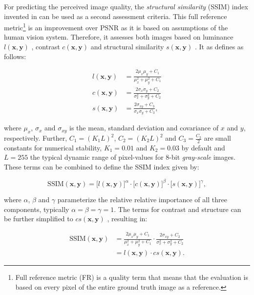 For predicting the perceived image quality, the \textit{structural similarity} (SSIM) index invented in \parencite{ssim} can be used as a second assessment criteria. This full reference metric\footnote{Full reference metric (FR) is a quality term that means that the evaluation is based on every pixel of the entire ground truth image as a reference.} is an improvement over PSNR as it is based on assumptions of the human vision system. Therefore, it assesses both images based on luminance $ l(\textbf{x}, \textbf{y}) $ , contrast $ c(\textbf{x}, \textbf{y}) $ and structural similarity $ s(\textbf{x}, \textbf{y}) $ \parencite{ms-ssim}. It as defines as follows:

\begin{equation} \label{eq:ssim-components}
\begin{aligned}
l(\textbf{x}, \textbf{y}) &= \frac{2 \mu_x \mu_y + C_1}{\mu_x^2 + \mu_y^2 + C_1} \\
c(\textbf{x}, \textbf{y}) &= \frac{2 \sigma_x \sigma_y + C_2}{\sigma_x^2 + \sigma_y^2 + C_2} \\
s(\textbf{x}, \textbf{y}) &= \frac{2 \sigma_{xy} + C_3}{\sigma_x \sigma_y + C_3} ,
\end{aligned}
\end{equation}

where $ \mu_x $, $ \sigma_x $ and $ \sigma_{xy} $ is the mean, standard deviation and covariance of $ x $ and $ y $, respectively. Further, $ C_1 = (K_1 L)^2 $, $ C_2 = (K_2 L)^2 $ and $ C_3 = \frac{C_2}{2} $ are small constants for numerical stability, $K_1 = 0.01$ and $ K_2 = 0.03 $ by default and $ L=255 $ the typical dynamic range of pixel-values for 8-bit \textit{gray-scale} images. These terms can be combined to define the SSIM index given by:

\begin{equation} \label{eq:ssim-combined}
\textrm{SSIM}(\textbf{x}, \textbf{y}) = \big[ l(\textbf{x}, \textbf{y})\big]^{\alpha} \cdot \big[c(\textbf{x}, \textbf{y}) \big]^{\beta} \cdot \big[ s(\textbf{x}, \textbf{y}) \big]^{\gamma} ,
\end{equation}

where $ \alpha $, $ \beta $ and $ \gamma $ parameterize the relative relative importance of all three components, typically $ \alpha = \beta = \gamma = 1 $. The terms for contrast and structure can be further simplified to $ cs(\textbf{x}, \textbf{y}) $ \parencite[p. 5]{loss-func-img-proc}, resulting in:

\begin{equation} \label{eq:ssim-simplified}
\begin{aligned}
\textrm{SSIM}(\textbf{x}, \textbf{y}) &= \frac{2 \mu_x \mu_y + C_1}{\mu_x^2 + \mu_y^2 + C_1} \cdot \frac{2 \sigma_{xy} + C_2}{\sigma_x^2 + \sigma_y^2 + C_2} \\
&= l(\textbf{x}, \textbf{y}) \cdot cs(\textbf{x}, \textbf{y}) .
\end{aligned}
\end{equation}

